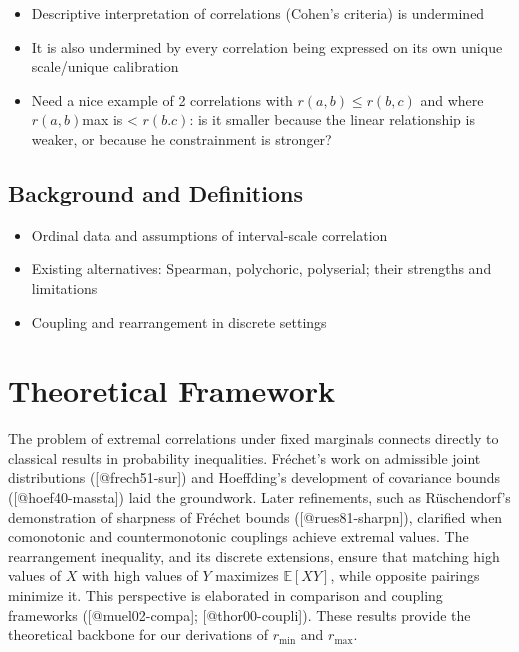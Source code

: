 \documentclass[
  12pt,
]{article}
\providecommand{\tightlist}{%
  \setlength{\itemsep}{0pt}\setlength{\parskip}{0pt}}
\theoremstyle{plain}
\theoremstyle{definition}
\theoremstyle{remark}
\begin{document}
\begin{itemize}
\tightlist
\item
  Descriptive interpretation of correlations (Cohen's criteria) is
  undermined
\item
  It is also undermined by every correlation being expressed on its own
  unique scale/unique calibration
\item
  Need a nice example of 2 correlations with \(r(a,b) \le r(b,c)\) and
  where \(r(a,b)\)max is \textless{} \(r(b.c)\): is it smaller because
  the linear relationship is weaker, or because he constrainment is
  stronger?
\end{itemize}

\subsection{Background and
Definitions}\label{background-and-definitions}

\begin{itemize}
\tightlist
\item
  Ordinal data and assumptions of interval-scale correlation\\
\item
  Existing alternatives: Spearman, polychoric, polyserial; their
  strengths and limitations\\
\item
  Coupling and rearrangement in discrete settings
\end{itemize}

\section{Theoretical Framework}\label{theoretical-framework}

The problem of extremal correlations under fixed marginals connects directly to classical results in probability inequalities. Fréchet’s work on admissible joint distributions ([@frech51-sur]) and Hoeffding’s development of covariance bounds ([@hoef40-massta]) laid the groundwork. Later refinements, such as Rüschendorf’s demonstration of sharpness of Fréchet bounds ([@rues81-sharpn]), clarified when comonotonic and countermonotonic couplings achieve extremal values. The rearrangement inequality, and its discrete extensions, ensure that matching high values of \( X \) with high values of \( Y \) maximizes \(\mathbb{E}[XY]\), while opposite pairings minimize it. This perspective is elaborated in comparison and coupling frameworks ([@muel02-compa]; [@thor00-coupli]). These results provide the theoretical backbone for our derivations of \(r_{\min}\) and \(r_{\max}\).
\end{document}
